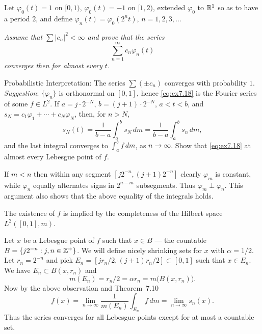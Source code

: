\begin{enumerate}
\begin{excopy}
Let \(\varphi_0(t) = 1\) on \([0,1)\), \(\varphi_0(t) = -1\)
on \([1,2)\), extended \(\varphi_0\) to \(\mathbb{R}^1\) so as to have a period $2$,
and define \(\varphi_n(t) = \varphi_0(2^n t)\), \(n=1,2,3,\ldots\)

\textsl{
Assume that \(\sum |c_n|^2 < \infty\) and prove that the series
\begin{equation} \label{eq:ex7.18}
\sum_{n=1}^\infty c_n\varphi_n(t)
\end{equation}
converges then for almost every $t$.
}

Probabilistic Interpretation: The series \(\sum(\pm c_n)\) converges
with probability $1$.\\
\emph{Suggestion}: \(\{\varphi_n\}\) is orthonormal on \([0,1]\), 
hence \eqref{eq:ex7.18} is the Fourier series of some \(f\in L^2\).
If \(a = j\cdot 2^{-N}\), \(b = (j+1)\cdot 2^{-N}\), \(a<t<b\),
and \(s_N = c_1\varphi_1 + \cdots + c_N\varphi_N\), then, for \(n>N\),
\begin{equation*}
s_N(t) = \frac{1}{b-a} \int_a^b s_N\,dm = \frac{1}{b-a} \int_a^b s_n\,dm,
\end{equation*}
and the last integral converges to \(\int_a^b f\,dm\), as \(n\to\infty\).
Show that \eqref{eq:ex7.18} at almost every Lebesgue point of $f$.
\end{excopy}

If \(m<n\) then within any segment \([j 2^{-n},  (j+1) 2^{-n}]\) clearly
\(\varphi_m\) is constant, while \(\varphi_n\) equally alternates signs
in \(2^{n-m}\) subsegments. Thus \(\varphi_m \perp \varphi_n\).
This argument also shows that the above equality of the integrals holds.

The existence of $f$ is implied by the completeness of 
the Hilbert space \(L^2([0,1],m)\).

Let $x$ be a Lebesgue point
of $f$ such that \(x\in B\) --- the countable \(B = \{j2^{-n}: j,n\in\mathbb{Z}^+\}\). 
We will define
nicely shrinking sets
for $x$ with \(\alpha = 1/2\). 
Let \(r_n=2^{-n}\) 
and pick \(E_n = [jr_n/2, (j+1)r_n/2]\subset [0,1]\)
such that \(x\in E_n\). 
We have 
\(E_n \subset B(x,r_n)\) and
\begin{equation*}
m(E_n) = r_n/2 = \alpha r_n = m\bigl(B(x,r_n)\bigr).
\end{equation*}
Now by the above observation and Theorem~7.10 \cite{RudinRCA87}
\begin{equation*}
f(x) 
= \lim_{n\to\infty} \frac{1}{m(E_n)} \int_{E_n} f\,dm
= \lim_{n\to\infty} s_n(x).
\end{equation*}
Thus the series converges for all Lebesgue points except for at most 
a countable set.



\end{enumerate}
